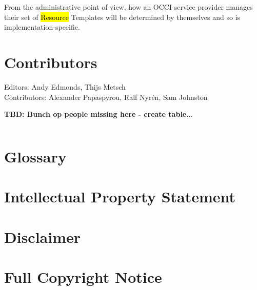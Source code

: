 \documentclass[10pt,a4paper]{article}
\begin{document}
From the administrative point of view, how an OCCI service provider manages their set of 
\hl{Resource} Templates will be determined by themselves and so is implementation-specific.


\section{Contributors}

Editors: Andy Edmonds, Thijs Metsch \\
Contributors: Alexander Papaspyrou, Ralf Nyr\'en, Sam Johnston

\textbf{TBD: Bunch op people missing here - create table\ldots}

\begin{verbatim}

\end{verbatim}

\section{Glossary}


\section{Intellectual Property Statement}


\section{Disclaimer}


\section{Full Copyright Notice}




\end{document}
